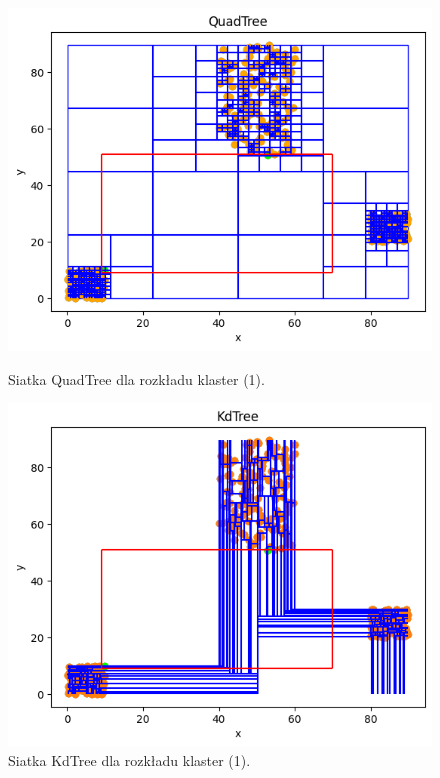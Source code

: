 \documentclass{lab}
\begin{document}
\begin{figure}[H]
  \centering
  \begin{minipage}{0.495\textwidth}
      \centering
      \includegraphics[width=1\textwidth]{resources/cluster_QuadTree_1.png}
      \caption{Siatka QuadTree dla rozkładu klaster (1).}
      \label{fig:cluster_QuadTree_1}
  \end{minipage}
  \begin{minipage}{0.495\textwidth}
      \centering
      \includegraphics[width=1\textwidth]{resources/cluster_KdTree_1.png}
      \caption{Siatka KdTree dla rozkładu klaster (1).}
      \label{fig:cluster_KdTree_1}
  \end{minipage}
\end{figure}
\end{document}
